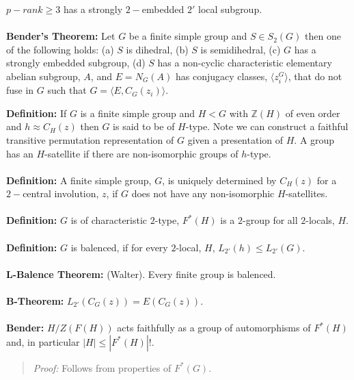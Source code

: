 $p-rank \ge 3$ has a strongly $2-$embedded $2'$ local subgroup.\\
\\
{\bf Bender's Theorem:} Let $G$ be a finite simple group and $S \in S_2(G)$ then one of the following holds:
(a) $S$ is dihedral, (b) $S$ is semidihedral, (c) $G$ has a strongly embedded subgroup,
(d) $S$ has a non-cyclic characteristic elementary abelian subgroup, $A$, and
$E=N_G(A)$ has conjugacy classes, $ \langle z_i^G \rangle $, that do not fuse in $G$ such that
$G= \langle E, C_G(z_i ) \rangle $.
\begin{quote}
\end{quote}
{\bf Definition:}
If $G$ is a finite simple group and
$H<G$ with ${\mathbb Z}(H)$ of even order and $h \approx C_H(z)$ then $G$ is said
to be of $H$-type.  Note we can construct a faithful transitive permutation representation
of $G$ given a presentation of $H$.  A group has an $H$-satellite if there are non-isomorphic
groups of $h$-type.
\\
\\
{\bf Definition:}
A finite simple group, $G$, is uniquely determined by $C_H(z)$ for a $2-$central
involution, $z$, if $G$ does not have any non-isomorphic $H$-satellites.
\\
\\
{\bf Definition:} $G$ is of characteristic $2$-type, $F^*(H)$ is a $2$-group for all $2$-locals,
$H$.
\\
\\
{\bf Definition:} $G$ is balenced, if for every $2$-local, $H$, $L_{2'}(h) \leq  L_{2'}(G)$.
\\
\\
{\bf L-Balence Theorem:} (Walter). Every finite group is balenced.
\\
\\
{\bf B-Theorem:} $L_{2'}(C_G(z)) = E(C_G(z))$.
\\
\\
{\bf Bender:} $H/Z(F(H))$ acts faithfully as a group of automorphisms of $F^*(H)$ and, in particular $|H| \leq |F^*(H)|!$.

\begin{quote}
\emph{Proof:} Follows from properties of $F^*(G)$.
\end{quote}

